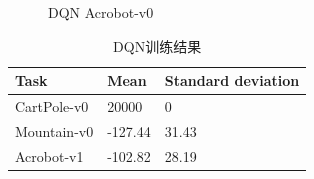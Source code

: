 \documentclass[a4paper,UTF8]{article}
\theoremstyle{definition}
\begin{document}
\begin{figure}[!h]
	\centering
	\caption{DQN Acrobot-v0}

\end{figure}


\begin{table}[!h]
\caption{DQN训练结果}  
\centering
\begin{tabular*}{8cm}{lll}  
\hline  
Task & Mean 
 &  Standard deviation\\  
\hline  
CartPole-v0  & 20000 & 0 \\  
Mountain-v0  & -127.44 & 31.43 \\ 
Acrobot-v1 	 & -102.82  & 28.19 \\ 
\hline  
\end{tabular*}  
\end{table} 

	

	
\end{document}
